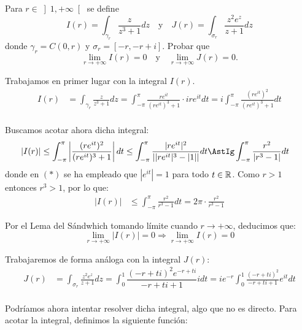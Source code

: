 \begin{ejercicio}
    Para $r \in \left]1,+\infty\right[$ se define
    \[
        I(r) = \int_{\gamma_r} \frac{z}{z^3+1}dz
        \quad \text{y} \quad
        J(r) = \int_{\sigma_r} \frac{z^2 e^z}{z+1}dz
    \]
    donde $\gamma_r = C(0,r)$ y $\sigma_r = [-r,-r+i]$. Probar que
    \[
        \lim_{r\to+\infty} I(r) = 0
        \quad \text{y} \quad
        \lim_{r\to+\infty} J(r) = 0.
    \]

    Trabajamos en primer lugar con la integral $I(r)$.
    \begin{align*}
        I(r) &= \int_{\gamma_r} \frac{z}{z^3+1}dz
        = \int_{-\pi}^{\pi} \frac{re^{it}}{(re^{it})^3+1}\cdot ire^{it}dt
        = i\int_{-\pi}^{\pi} \frac{(re^{it})^2}{(re^{it})^3+1} dt \\
    \end{align*}

    Buscamos acotar ahora dicha integral:
    \begin{align*}
        |I(r)| &\leq \int_{-\pi}^{\pi} \left|\frac{(re^{it})^2}{(re^{it})^3+1}\right|dt
        \leq \int_{-\pi}^{\pi} \frac{|re^{it}|^2}{\left||re^{it}|^3-|1|\right|}dt 
        \AstIg \int_{-\pi}^{\pi} \frac{r^2}{|r^3-1|}dt
    \end{align*}
    donde en $(\ast)$ se ha empleado que $|e^{it}|=1$ para todo $t \in \mathbb{R}$. Como $r>1$ entonces $r^3>1$, por lo que:
    \begin{align*}
        |I(r)| &\leq \int_{-\pi}^{\pi} \frac{r^2}{r^3-1}dt = 2\pi\cdot \frac{r^2}{r^3-1}
    \end{align*}

    Por el Lema del Sándwhich tomando límite cuando $r \to +\infty$, deducimos que:
    \begin{equation*}
        \lim_{r\to+\infty} |I(r)| = 0
        \Longrightarrow \lim_{r\to+\infty} I(r) = 0
    \end{equation*}

    Trabajaremos de forma análoga con la integral $J(r)$:
    \begin{align*}
        J(r) &= \int_{\sigma_r} \frac{z^2 e^z}{z+1}dz
        = \int_{0}^{1} \dfrac{(-r+ti)^2e^{-r+ti}}{-r+ti+1}i dt
        = ie^{-r}\int_{0}^{1} \frac{(-r+ti)^2}{-r+ti+1}e^{it}dt \\
    \end{align*}

    Podríamos ahora intentar resolver dicha integral, algo que no es directo. Para acotar la integral, definimos la siguiente función:


\end{ejercicio}
